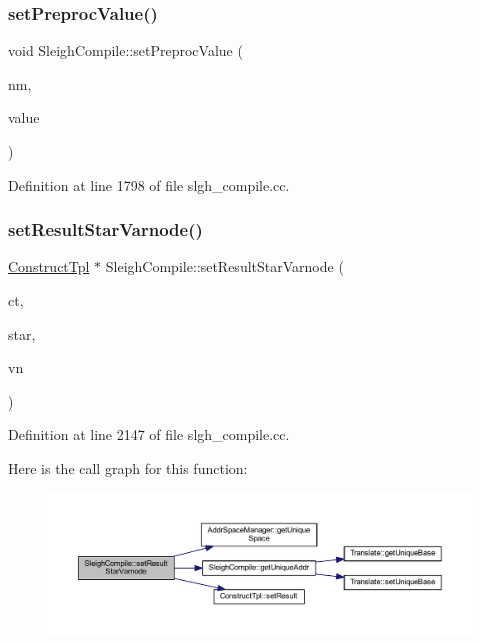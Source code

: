 \subsubsection{\texorpdfstring{setPreprocValue()}{setPreprocValue()}}
{\footnotesize\ttfamily void Sleigh\+Compile\+::set\+Preproc\+Value (\begin{DoxyParamCaption}\item[{const string \&}]{nm,  }\item[{const string \&}]{value }\end{DoxyParamCaption})}



Definition at line 1798 of file slgh\+\_\+compile.\+cc.

\mbox{\label{class_sleigh_compile_a5d9ed43987bc167ad93691052361975d}} 
\subsubsection{\texorpdfstring{setResultStarVarnode()}{setResultStarVarnode()}}
{\footnotesize\ttfamily \mbox{\hyperlink{class_construct_tpl}{Construct\+Tpl}} $\ast$ Sleigh\+Compile\+::set\+Result\+Star\+Varnode (\begin{DoxyParamCaption}\item[{\mbox{\hyperlink{class_construct_tpl}{Construct\+Tpl}} $\ast$}]{ct,  }\item[{\mbox{\hyperlink{struct_star_quality}{Star\+Quality}} $\ast$}]{star,  }\item[{\mbox{\hyperlink{class_varnode_tpl}{Varnode\+Tpl}} $\ast$}]{vn }\end{DoxyParamCaption})}



Definition at line 2147 of file slgh\+\_\+compile.\+cc.

Here is the call graph for this function\+:
\nopagebreak
\begin{figure}[H]
\begin{center}
\leavevmode
\includegraphics[width=350pt]{class_sleigh_compile_a5d9ed43987bc167ad93691052361975d_cgraph}
\end{center}
\end{figure}
\mbox{\label{class_sleigh_compile_a4faccf9bdca5d00e52a51ad46ce6de91}} 
